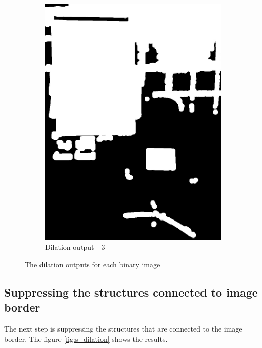 \documentclass[paper=a4, fontsize=10pt]{scrartcl} %
\numberwithin{equation}{section} %
\numberwithin{figure}{section} %
\begin{document}
\begin{figure}[!ht]
\begin{subfigure}[b]{0.275\textwidth}
		\includegraphics[width=\textwidth]{dilation_03}
		\caption{Dilation output - 3}
		\label{fig:dilation_output_03}
	\end{subfigure}
	\caption{The dilation outputs for each binary image}
	\label{fig:dilation}
\end{figure}

\subsection{Suppressing the structures connected to image border}
The next step is suppressing the structures that are connected to the image border. The figure \ref{fig:s_dilation} shows the results.
\end{document}
